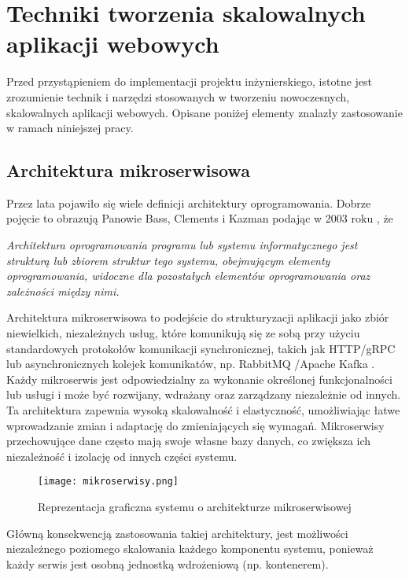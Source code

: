 \clearpage
\section{Techniki tworzenia skalowalnych aplikacji webowych}

Przed przystąpieniem do implementacji projektu inżynierskiego, istotne jest zrozumienie technik i narzędzi stosowanych w tworzeniu nowoczesnych, skalowalnych aplikacji webowych. Opisane poniżej elementy znalazły zastosowanie w ramach niniejszej pracy.

\subsection{Architektura mikroserwisowa}

Przez lata pojawiło się wiele definicji architektury oprogramowania. Dobrze pojęcie to obrazują Panowie Bass, Clements i Kazman podając w 2003 roku \cite{bass2012software}, że

\begin{displayquote}
\emph{Architektura oprogramowania programu lub systemu informatycznego jest strukturą lub zbiorem struktur tego systemu, obejmującym elementy oprogramowania, widoczne dla pozostałych elementów oprogramowania oraz zależności między nimi.}
\end{displayquote}

Architektura mikroserwisowa to podejście do strukturyzacji aplikacji jako zbiór niewielkich, niezależnych usług, które komunikują się ze sobą przy użyciu standardowych protokołów komunikacji synchronicznej, takich jak HTTP/gRPC \cite{grpc} lub asynchronicznych kolejek komunikatów, np. RabbitMQ \cite{rabbitmq}/Apache Kafka \cite{kafka}. Każdy mikroserwis jest odpowiedzialny za wykonanie określonej funkcjonalności lub usługi i może być rozwijany, wdrażany oraz zarządzany niezależnie od innych. Ta architektura zapewnia wysoką skalowalność i elastyczność, umożliwiając łatwe wprowadzanie zmian i adaptację do zmieniających się wymagań. Mikroserwisy przechowujące dane często mają swoje własne bazy danych, co zwiększa ich niezależność i izolację od innych części systemu.

\begin{figure}[!h]
    \centering \texttt{[image: mikroserwisy.png]}
    \caption{Reprezentacja graficzna systemu o architekturze mikroserwisowej \cite{microservices_rys}}
\end{figure}


Główną konsekwencją zastosowania takiej architektury, jest możliwości niezależnego poziomego skalowania każdego komponentu systemu, ponieważ każdy serwis jest osobną jednostką wdrożeniową (np. kontenerem).

